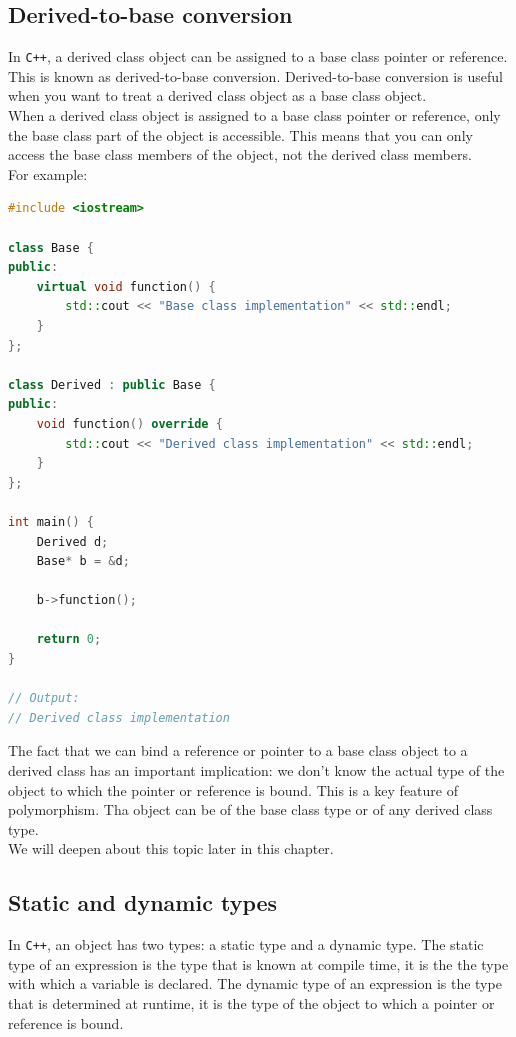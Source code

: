 \subsection{Derived-to-base conversion}

In \texttt{C++}, a derived class object can be assigned to a base class pointer or reference.
This is known as derived-to-base conversion. Derived-to-base conversion is useful when you
want to treat a derived class object as a base class object.\\

When a derived class object is assigned to a base class pointer or reference, only the base
class part of the object is accessible. This means that you can only access the base class
members of the object, not the derived class members.\\

For example:\\

\begin{lstlisting}[language=C++]
#include <iostream>

class Base {
public:
    virtual void function() {
        std::cout << "Base class implementation" << std::endl;
    }
};

class Derived : public Base {
public:
    void function() override {
        std::cout << "Derived class implementation" << std::endl;
    }
};

int main() {
    Derived d;
    Base* b = &d;

    b->function();

    return 0;
}

// Output:
// Derived class implementation
\end{lstlisting}

The fact that we can bind a reference or pointer to a base class object to a derived class
has an important implication: we don't know the actual type of the object to which the pointer
or reference is bound. This is a key feature of polymorphism. Tha object can be of the base
class type or of any derived class type.\\

We will deepen about this topic later in this chapter.

\subsection{Static and dynamic types}

In \texttt{C++}, an object has two types: a static type and a dynamic type. The static type
of an expression is the type that is known at compile time, it is the the type with which
a variable is declared. The dynamic type of an expression is the type that is determined at
runtime, it is the type of the object to which a pointer or reference is bound.\\

